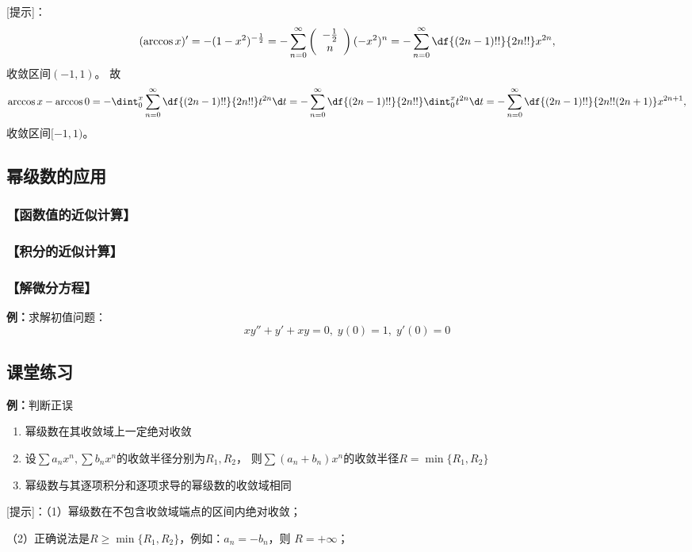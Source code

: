[提示]：
$$(\arccos x)'=-(1-x^2)^{-\frac12}
=-\sum\limits_{n=0}^{\infty}
\left(\begin{array}{c} -\frac12 \\ n \end{array}\right)(-x^2)^n
=-\sum\limits_{n=0}^{\infty}\df{(2n-1)!!}{2n!!}x^{2n},
$$
收敛区间$(-1,1)$。
故
$$\arccos x-\arccos0
=-\dint_0^x\sum\limits_{n=0}^{\infty}\df{(2n-1)!!}{2n!!}t^{2n}\d t
=-\sum\limits_{n=0}^{\infty}\df{(2n-1)!!}{2n!!}\dint_0^xt^{2n}\d t
=-\sum\limits_{n=0}^{\infty}\df{(2n-1)!!}{2n!!(2n+1)}x^{2n+1},$$
收敛区间$[-1,1)$。

\subsection{幂级数的应用}

\subsubsection{【函数值的近似计算】}

\subsubsection{【积分的近似计算】}

\subsubsection{【解微分方程】}

{\bf 例：}求解初值问题：$$xy''+y'+xy=0,\;y(0)=1,\;y'(0)=0$$

\subsection{课堂练习}

{\bf 例：}判断正误
\begin{enumerate}[(1)]
  \setlength{\itemindent}{1cm}
  \item 幂级数在其收敛域上一定绝对收敛 \;{{$(\;\times\;)$}} 
  \item 设$\sum a_nx^n,\sum b_nx^n$的收敛半径分别为$R_1,R_2$，
  则$\sum(a_n+b_n)x^n$的收敛半径$R=\min\{R_1,R_2\}$ 
  \;{{$(\;\times\;)$}} 
  \item 幂级数与其逐项积分和逐项求导的幂级数的收敛域相同 
  \;{{$(\;\times\;)$}}
\end{enumerate}

[提示]：（1）幂级数在不包含收敛域端点的区间内绝对收敛；

（2）正确说法是$R\geq\min\{R_1,R_2\}$，例如：$a_n=-b_n$，则
$R=+\infty$；

